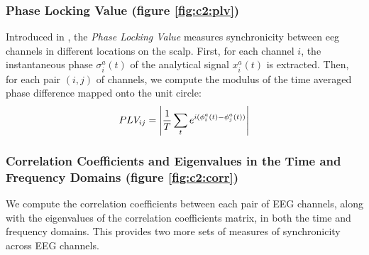 \subsubsection{Phase Locking Value (figure \ref{fig:c2:plv})}
Introduced in \cite{lachaux1999measuring}, the \emph{Phase Locking Value} measures synchronicity between eeg channels in different locations on the scalp. First, for each channel $i$, the instantaneous phase $\sigma_i ^a (t)$ of the analytical signal $x_i^a(t)$ is extracted. Then, for each pair $(i, j)$ of channels, we compute the modulus of the time averaged phase difference mapped onto the unit circle:
\begin{equation}
    PLV_{ij} = \abs{\frac{1}{T}\sum_t e^{i(\phi_i^a(t) - \phi_j^a(t))} }
\end{equation}


\subsubsection{Correlation Coefficients and Eigenvalues in the Time and Frequency Domains (figure \ref{fig:c2:corr})}
We compute the correlation coefficients between each pair of EEG channels, along with the eigenvalues of the correlation coefficients matrix, in both the time and frequency domains.
This provides two more sets of measures of synchronicity across EEG channels.

